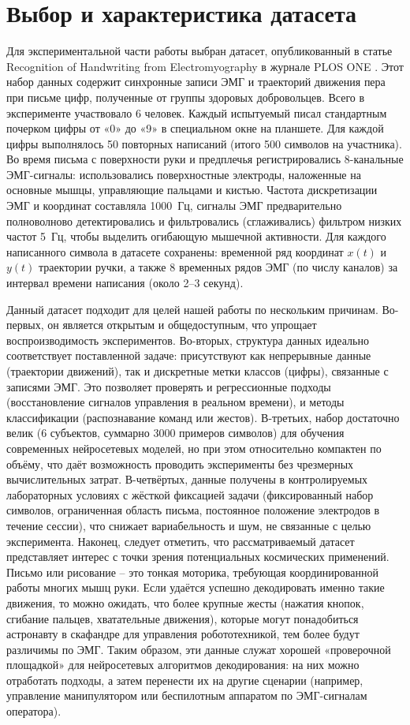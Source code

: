 \documentclass[12pt,a4paper]{article}
\begin{document}
\section{Выбор и характеристика датасета}
Для экспериментальной части работы выбран датасет, опубликованный в статье Recognition of Handwriting from Electromyography  в журнале PLOS ONE \cite{35}. Этот набор данных содержит синхронные записи ЭМГ и траекторий движения пера при письме цифр, полученные от группы здоровых добровольцев. Всего в эксперименте участвовало 6 человек. Каждый испытуемый писал стандартным почерком цифры от «0» до «9» в специальном окне на планшете. Для каждой цифры выполнялось 50 повторных написаний (итого 500 символов на участника). Во время письма с поверхности руки и предплечья регистрировались 8-канальные ЭМГ-сигналы: использовались поверхностные электроды, наложенные на основные мышцы, управляющие пальцами и кистью. Частота дискретизации ЭМГ и координат составляла 1000~Гц, сигналы ЭМГ предварительно полноволново детектировались и фильтровались (сглаживались) фильтром низких частот 5~Гц, чтобы выделить огибающую мышечной активности. Для каждого написанного символа в датасете сохранены: временной ряд координат $x(t)$ и $y(t)$ траектории ручки, а также 8 временных рядов ЭМГ (по числу каналов) за интервал времени написания (около 2--3 секунд).

Данный датасет подходит для целей нашей работы по нескольким причинам. Во-первых, он является открытым и общедоступным, что упрощает воспроизводимость экспериментов. Во-вторых, структура данных идеально соответствует поставленной задаче: присутствуют как непрерывные данные (траектории движений), так и дискретные метки классов (цифры), связанные с записями ЭМГ. Это позволяет проверять и регрессионные подходы (восстановление сигналов управления в реальном времени), и методы классификации (распознавание команд или жестов). В-третьих, набор достаточно велик (6 субъектов, суммарно 3000 примеров символов) для обучения современных нейросетевых моделей, но при этом относительно компактен по объёму, что даёт возможность проводить эксперименты без чрезмерных вычислительных затрат. В-четвёртых, данные получены в контролируемых лабораторных условиях с жёсткой фиксацией задачи (фиксированный набор символов, ограниченная область письма, постоянное положение электродов в течение сессии), что снижает вариабельность и шум, не связанные с целью эксперимента.
Наконец, следует отметить, что рассматриваемый датасет представляет интерес с точки зрения потенциальных космических применений. Письмо или рисование – это тонкая моторика, требующая координированной работы многих мышц руки. Если удаётся успешно декодировать именно такие движения, то можно ожидать, что более крупные жесты (нажатия кнопок, сгибание пальцев, хватательные движения), которые могут понадобиться астронавту в скафандре для управления робототехникой, тем более будут различимы по ЭМГ. Таким образом, эти данные служат хорошей «проверочной площадкой» для нейросетевых алгоритмов декодирования: на них можно отработать подходы, а затем перенести их на другие сценарии (например, управление манипулятором или беспилотным аппаратом по ЭМГ-сигналам оператора).
\end{document}
